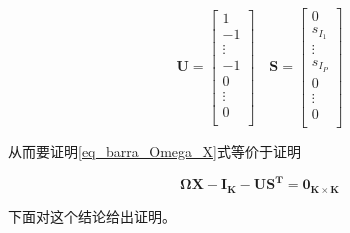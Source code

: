 \begin{equation}
    \bm{U} = \left[
        \begin{array}{c}
            1      \\
            -1     \\
            \vdots \\
            -1     \\
            0      \\
            \vdots \\
            0      \\
        \end{array}
        \right] \quad
    \bm{S} = \left[
        \begin{array}{c}
            0       \\
            s_{I_1} \\
            \vdots  \\
            s_{I_P} \\
            0       \\
            \vdots  \\
            0       \\
        \end{array}
        \right]
\end{equation}

从而要证明\ref{eq_barra_Omega_X}式等价于证明

\begin{equation}\label{eq_barra_Omega_X_alt}
    \bm{\Omega X - I_{K} - US^T} = \bm{0_{K\times K}}
\end{equation}

下面对这个结论给出证明。

